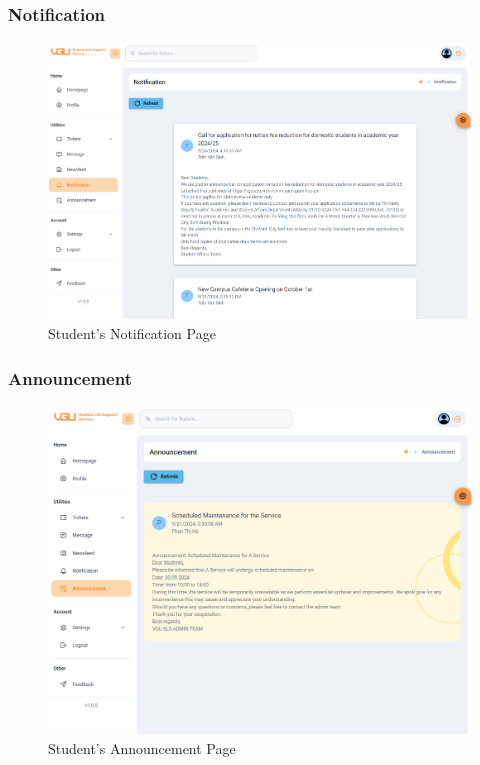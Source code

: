 	
	
	\subsubsection{Notification}
	\begin{figure}[H]
		\centering
		\includegraphics[width=1.0\linewidth]{graphics/gui/student/noti}
		\caption{Student's Notification Page}
		\label{fig:gui-std-noti}
	\end{figure}
	
	
	
	\subsubsection{Announcement}
	\begin{figure}[H]
		\centering
		\includegraphics[width=1.0\linewidth]{graphics/gui/student/announcement}
		\caption{Student's Announcement Page}
		\label{fig:gui-std-announcement}
	\end{figure}
	
